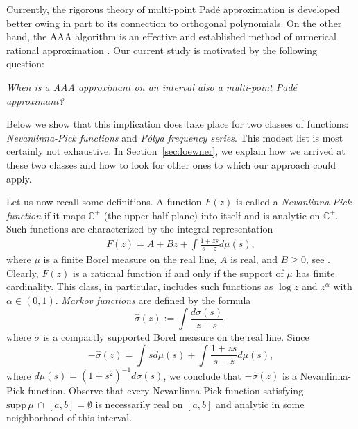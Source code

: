 \documentclass[twoside,a4paper]{amsart}
\newcommand{\C}     {\mathbb{C}}
\newcommand{\supp}{\mathrm{supp}}
\theoremstyle{remark}
\begin{document}
Currently, the rigorous theory of multi-point Pad\'e approximation is developed better owing in part to its connection to orthogonal polynomials. On the other hand, the AAA algorithm is an effective and established method of numerical rational approximation \cite{MR5088237}.  Our current study is motivated by the following question: 
\smallskip

\emph{When is a AAA approximant on an interval  also a multi-point Pad\'e approximant?} 
\smallskip

\noindent
Below we show that this implication does take place for  two classes of functions: \emph{Nevanlinna-Pick functions} and \emph{P\'olya frequency series}. This modest list is most certainly not exhaustive. In Section~\ref{sec:loewner}, we explain how we arrived at these two classes and how to look for other ones to which our approach could apply.

Let us now recall some definitions. A function \( F(z) \) is called a \emph{Nevanlinna-Pick function} if it maps $\C^+$ (the upper half-plane) into itself and is analytic on $\C^+$. Such functions are characterized by the integral representation
\begin{align}
\label{N-P}
F(z) = A+ Bz + \int\frac{1+zs}{s-z}d\mu(s),
\end{align}
where \(\mu\) is a finite Borel measure on the real line, \( A \) is real, and \( B\geq 0 \), see \cite{Simon}. Clearly, \( F(z) \) is a rational function if and only if the support of \( \mu \) has finite cardinality. This class, in particular, includes such functions as \( \log z\) and \( z^\alpha \) with \( \alpha\in (0,1) \). {\it Markov functions} are defined by the formula
\[
\widehat\sigma(z) := \int\frac{d\sigma(s)}{z-s},
\]
where \( \sigma \) is a compactly supported Borel measure on the real line. Since
\[
-\widehat\sigma(z)= \int{s}d\mu(s) + \int\frac{1+zs}{s-z}d\mu(s),
\]
where \( d\mu(s) =(1+s^2)^{-1}d\sigma(s) \), we conclude that $-\widehat\sigma(z)$ is a Nevanlinna-Pick function. Observe that every Nevanlinna-Pick function  satisfying  $\supp\, \mu\, \cap\, [a,b]=\emptyset$ is necessarily real on $[a,b]$ and analytic in some neighborhood of this interval. 
\end{document}
